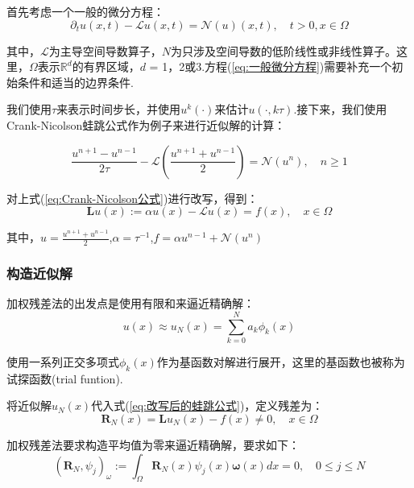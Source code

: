 \documentclass[12pt]{ctexart}
\numberwithin{equation}{section} %
\begin{document}
    首先考虑一个一般的微分方程：
    \begin{equation}
        \partial_tu(x,t)-\mathscr{L}u(x,t)=\mathscr{N}(u)(x,t),\quad t>0,x\in\Omega
        \label{eq:一般微分方程}
    \end{equation}

    其中，$\mathscr{L}$为主导空间导数算子，$N$为只涉及空间导数的低阶线性或非线性算子。这里，$\Omega$表示$\mathbb{R}^{d}$的有界区域，$d$ = 1，2或3.方程(\ref{eq:一般微分方程})需要补充一个初始条件和适当的边界条件.

    我们使用$\tau$来表示时间步长，并使用$u^k(\cdot)$来估计$u(\cdot,k\tau)$.接下来，我们使用Crank-Nicolson蛙跳公式作为例子来进行近似解的计算：

    \begin{equation}
        \frac{u^{n+1}-u^{n-1}}{2\tau}-\mathscr{L}\left(\frac{u^{n+1}+u^{n-1}}2\right)=\mathscr{N}(u^n),\quad n\geq1
        \label{eq:Crank-Nicolson公式}
    \end{equation}

    对上式(\ref{eq:Crank-Nicolson公式})进行改写，得到：
    \begin{equation}
        \mathbf{L}u(x):=\alpha u(x)-\mathscr{L}u(x)=f(x),\quad x\in\Omega
        \label{eq:改写后的蛙跳公式}
    \end{equation}

    其中，$u=\frac{u^{n+1}+u^{n-1}}2$,$\alpha=\tau^{-1}$,$f=\alpha u^{n-1}+\mathcal{N}(u^{n})$

\subsubsection{构造近似解}
    加权残差法的出发点是使用有限和来逼近精确解：
    \begin{equation}
        u(x)\approx u_N(x)=\sum_{k=0}^Na_k\phi_k(x)
        \label{eq:基函数展开}
    \end{equation}
    
    使用一系列正交多项式${\phi_k(x)}$作为基函数对解进行展开，这里的基函数也被称为试探函数(trial funtion).

    将近似解$u_N(x)$代入式(\ref{eq:改写后的蛙跳公式})，定义残差为：
    \begin{equation}
        \mathbf{R}_N(x)=\mathbf{L}u_N(x)-f(x)\neq0,\quad x\in\Omega
        \label{eq:残差定义} 
    \end{equation}

    加权残差法要求构造平均值为零来逼近精确解，要求如下：
    \begin{equation}
        \boxed{(\mathbf{R}_N,\psi_j)_\omega:=\int_\Omega\mathbf{R}_N(x)\psi_j(x)\boldsymbol{\omega}(x)dx=0,\quad0\leq j\leq N}
        \label{eq:加权残差法要求1}
    \end{equation}
\end{document}
